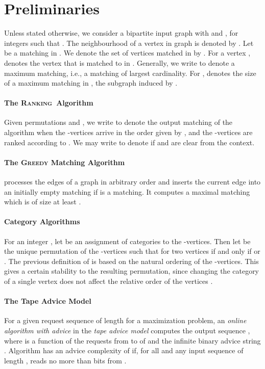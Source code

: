 \documentclass[a4paper]{article}
\newcommand{\Rank}{\textsc{Ranking}}
\begin{document}
\section{Preliminaries}\label{sec:prelim}
Unless stated otherwise, we consider a bipartite input graph  with  and
, for integers  such that .
The neighbourhood of a vertex  in graph  is denoted by .
Let  be a matching in . We denote the set of vertices matched in  by . For a vertex ,
 denotes the vertex that is matched to  in . Generally, we write  to denote a maximum
matching, i.e., a matching of largest cardinality. For ,
 denotes the size of a maximum matching in , the subgraph induced by .

\paragraph*{The \Rank~Algorithm}
Given permutations 
and , we write  to denote the output matching of the
 algorithm when the -vertices arrive in the order given by , and the -vertices are ranked
according to . We may write  to denote  if  and 
are clear from the context.

\paragraph*{The \textsc{Greedy} Matching Algorithm}  processes the edges
of a graph in arbitrary order and inserts the current edge  into an initially empty matching  if
 is a matching. It computes a maximal matching which is of size at least .


\paragraph*{Category Algorithms} For an integer , let  be an assignment
of categories to the -vertices. Then let  be the unique permutation of the
-vertices such that for two vertices   if
and only if  or . The previous definition of 
is based on the natural ordering of the -vertices. This gives a certain stability to the resulting permutation,
since changing the category of a single vertex  does not affect the relative order of the vertices
.




\paragraph*{The Tape Advice Model} For a given request sequence  of length  for a maximization problem,
an \emph{online algorithm with advice} in the \emph{tape advice model} computes the output sequence
, where  is a function of the requests from  to
 of  and the infinite binary advice string . Algorithm  has an advice complexity of  if,
for all  and any input sequence of length ,  reads no more than  bits from .
\end{document}
